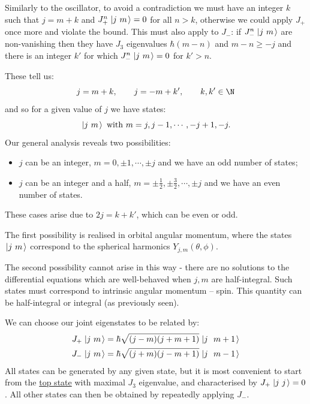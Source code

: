\documentclass[../Main.tex]{subfiles}
\begin{document}
Similarly to the oscillator, to avoid a contradiction we must have an integer $k$ such that $j = m + k$ and $J^n_+ \left.\left|j~m\right.\right\rangle = 0$ for all $n > k$, otherwise we could apply $J_+$ once more and violate the bound. This must also apply to $J_-$: if $J_-^n \left.\left|j~m\right.\right\rangle$ are non-vanishing then they have $J_3$ eigenvalues $\hbar(m-n)$ and $m-n \geq -j$ and there is an integer $k'$ for which $J_-^n \left.\left|j~m\right.\right\rangle = 0$ for $k' > n$.

These tell us:
\begin{equation*}
    j = m + k,\qquad j = -m + k',\qquad k, k' \in \N
\end{equation*}
and so for a given value of $j$ we have states:
\begin{equation*}
    \left.\left|j~m\right.\right\rangle \text{ with } m = j, j-1, \cdots, -j+1, -j.
\end{equation*}
Our general analysis reveals two possibilities:
\begin{itemize}
    \item $j$ can be an integer, $m = 0, \pm 1, \cdots, \pm j$ and we have an odd number of states;
    \item $j$ can be an integer and a half, $m = \pm\frac12, \pm \frac32, \cdots, \pm j$ and we have an even number of states.
\end{itemize}
These cases arise due to $2j = k + k'$, which can be even or odd.

The first possibility is realised in orbital angular momentum, where the states $\left.\left|j~m\right.\right\rangle$ correspond to the spherical harmonics $Y_{j, m}(\theta, \phi)$.

The second possibility cannot arise in this way - there are no solutions to the differential equations which are well-behaved when $j, m$ are half-integral. Such states must correspond to intrinsic angular momentum -- spin. This quantity can be half-integral or integral (as previously seen).

We can choose our joint eigenstates to be related by:
\begin{align*}
    J_+ \left.\left|j~m\right.\right\rangle &= \hbar \sqrt{(j-m)(j + m + 1)} \left.\left|j~~m+1\right.\right\rangle \\
    J_- \left.\left|j~m\right.\right\rangle &= \hbar \sqrt{(j+m)(j - m + 1)} \left.\left|j~~m-1\right.\right\rangle \\
\end{align*}
All states can be generated by any given state, but it is most convenient to start from the \underline{top state} with maximal $J_3$ eigenvalue, and characterised by $J_+ \left.\left|j~j\right.\right\rangle = 0$. All other states can then be obtained by repeatedly applying $J_-$.
\end{document}
